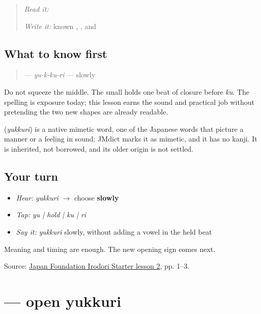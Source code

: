 \label{lesson:JA-C10-yukkuri}



\begin{quote}
\emph{Read it:} \textbf{}

\emph{Write it:} known \textbf{}, \textbf{}, and \textbf{}
\end{quote}

\subsection*{What to know first}
\begin{quote}
\textbf{} — \emph{yu-k-ku-ri} — slowly
\end{quote}

Do not squeeze the middle. The small \textbf{} holds one beat of closure before \emph{ku}. The spelling is exposure today; this lesson earns the sound and practical job without pretending the two new shapes are already readable.

\begin{cousinweb}
\textbf{} (\emph{yukkuri}) is a native mimetic word, one of the Japanese words that picture a manner or a feeling in sound; JMdict marks it as mimetic, and it has no kanji. It is inherited, not borrowed, and its older origin is not settled.
\end{cousinweb}

\subsection*{Your turn}
\begin{itemize}
\raggedright
  \item \emph{Hear:} \emph{yukkuri} $\to$ choose \textbf{slowly}
  \item \emph{Tap:} \emph{yu | hold | ku | ri}
  \item \emph{Say it:} \emph{yukkuri} slowly, without adding a vowel in the held beat
\end{itemize}

\begin{tcolorbox}[breakable,colback=teal!4,colframe=teal!35!black,title={Before you move on}]
Meaning and timing are enough. The new opening sign comes next.

Source: \href{https://www.irodori.jpf.go.jp/assets/data/starter/pdf/X\_L02.pdf}{Japan Foundation Irodori Starter lesson 2}, pp. 1–3.
\end{tcolorbox}
\section[\texorpdfstring{\ja{ゆ} (yu)}{ゆ (yu)}]{ — open yukkuri}

